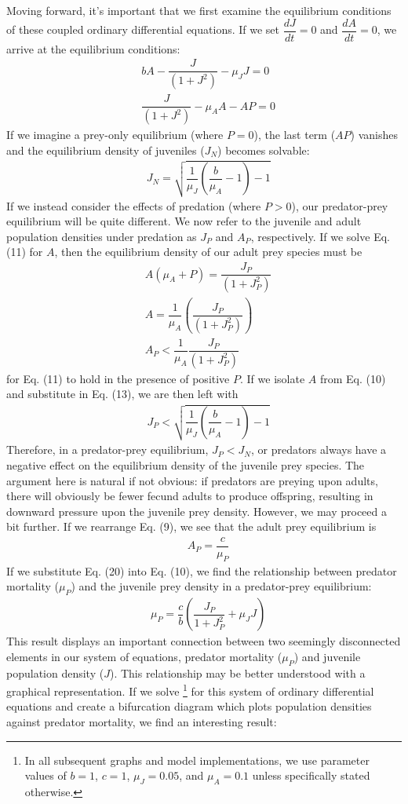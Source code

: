 \documentclass[12pt]{article}
\begin{document}
Moving forward, it's important that we first examine the equilibrium conditions of these coupled ordinary differential equations. If we set $ \dfrac{dJ}{dt}=0$ and $ \dfrac{dA}{dt}=0$, we arrive at the equilibrium conditions:
\begin{align}
	& bA - \dfrac{J}{(1+J^2)} - \mu_JJ = 0\\
	& \dfrac{J}{(1+J^2)} - \mu_A A - AP = 0
\end{align}
If we imagine a prey-only equilibrium (where $P=0$), the last term ($AP$) vanishes and the equilibrium density of juveniles ($J_N$) becomes solvable:
\begin{align}
	& J_N = \sqrt{ \dfrac{1}{\mu_J}\left(\dfrac{b}{\mu_A}-1\right)-1}
\end{align}
If we instead consider the effects of predation (where $ P>0$), our predator-prey equilibrium will be quite different. We now refer to the juvenile and adult population densities under predation as $J_P$ and $A_P$, respectively. If we solve Eq. (11) for $A$, then the equilibrium density of our adult prey species must be
\begin{align}
	& A(\mu_A + P) = \dfrac{J_P}{(1+J_P^2)}\\
	&  A = \dfrac{1}{\mu_A}\left(\dfrac{J_P}{(1+J^2_P)}\right)\\
	 & A_P< \dfrac{1}{\mu_A} \dfrac{J_P}{(1+J_P^2)}
\end{align}
for Eq. (11) to hold in the presence of positive $P$. If we isolate $A$ from Eq. (10) and substitute in Eq. (13), we are then left with
\begin{align}
	& J_P < \sqrt{ \dfrac{1}{\mu_J}\left(\dfrac{b}{\mu_A}-1\right)-1}
\end{align}
Therefore, in a predator-prey equilibrium, $J_P < J_N$, or predators always have a negative effect on the equilibrium density of the juvenile prey species. The argument here is natural if not obvious: if predators are preying upon adults, there will obviously be fewer fecund adults to produce offspring, resulting in downward pressure upon the juvenile prey density. However, we may proceed a bit further. If we rearrange Eq. (9), we see that the adult prey equilibrium is
\begin{align}
	& A_P = \dfrac{c}{\mu_P}
\end{align}
If we substitute Eq. (20) into Eq. (10), we find the relationship between predator mortality ($\mu_P$) and the juvenile prey density in a predator-prey equilibrium:
\begin{align}
	& \mu_P = \dfrac{c}{b}\left(\dfrac{J_P}{1+J_P^2}+\mu_JJ\right)
\end{align}
This result displays an important connection between two seemingly disconnected elements in our system of equations, predator mortality ($\mu_P$) and juvenile population density ($J$). This relationship may be better understood with a graphical representation. If we solve \footnote{In all subsequent graphs and model implementations, we use parameter values of $b=1$, $c=1$, $\mu_J = 0.05$, and $\mu_A = 0.1$ unless specifically stated otherwise.} for this system of ordinary differential equations and create a bifurcation diagram which plots population densities against predator mortality, we find an interesting result: 
\end{document}
